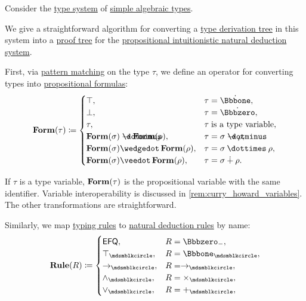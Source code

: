 \begin{algorithm}\label{alg:type_derivation_to_proof_tree}
  Consider the \hyperref[def:abstract_type_system]{type system} of \hyperref[def:simple_algebraic_types]{simple algebraic types}.

  We give a straightforward algorithm for converting a \hyperref[def:type_derivation_tree]{type derivation tree} in this system into a \hyperref[def:natural_deduction_proof_tree]{proof tree} for the \hyperref[def:propositional_natural_deduction_systems]{propositional intuitionistic natural deduction system}.

  \begin{thmenum}
     First, via \hyperref[con:evaluation]{pattern matching} on the type \( \tau \), we define an operator for converting types into \hyperref[def:propositional_syntax/formula]{propositional formulas}:
    \begin{equation*}
      \op*{Form}(\tau) \coloneqq \begin{cases}
        \top,                                            &\tau = \syn\Bbbone, \\
        \bot,                                            &\tau = \syn\Bbbzero, \\
        \tau,                                            &\tau \T{is a type variable}, \\
        \op*{Form}(\sigma) \synimplies \op*{Form}(\rho), &\tau = \sigma \synimplies \rho, \\
        \op*{Form}(\sigma) \synwedge \op*{Form}(\rho),   &\tau = \sigma \syntimes \rho, \\
        \op*{Form}(\sigma) \synvee \op*{Form}(\rho),     &\tau = \sigma \synplus \rho. \\
      \end{cases}
    \end{equation*}

    If \( \tau \) is a type variable, \( \op*{Form}(\tau) \) is the propositional variable with the same identifier. Variable interoperability is discussed in \cref{rem:curry_howard_variables}. The other transformations are straightforward.

     Similarly, we map \hyperref[def:simple_typing_rule]{typing rules} to \hyperref[def:natural_deduction_rule]{natural deduction rules} by name:
    \begin{equation*}
      \op*{Rule}(R) \coloneqq \begin{cases}
        \logic{EFQ},         &R = \Bbbzero_-, \\
        \top_{\Anon},        &R = \Bbbone_{\Anon}, \\
        \rightarrow_{\Anon}, &R = \rightarrow_{\Anon}, \\
        \wedge_{\Anon},      &R = \times_{\Anon}, \\
        \vee_{\Anon},        &R = +_{\Anon}, \\
      \end{cases}
    \end{equation*}


\end{thmenum}
\end{algorithm}
